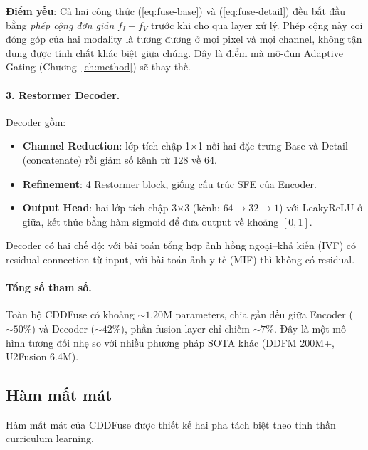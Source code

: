 \textbf{Điểm yếu}: Cả hai công thức (\ref{eq:fuse-base}) và (\ref{eq:fuse-detail}) đều bắt đầu bằng \emph{phép cộng đơn giản} $f_I + f_V$ trước khi cho qua layer xử lý. Phép cộng này coi đóng góp của hai modality là tương đương ở mọi pixel và mọi channel, không tận dụng được tính chất khác biệt giữa chúng. Đây là điểm mà mô-đun Adaptive Gating (Chương~\ref{ch:method}) sẽ thay thế.

\paragraph{3. Restormer Decoder.}
Decoder gồm:
\begin{itemize}\itemsep0pt
    \item \textbf{Channel Reduction}: lớp tích chập 1$\times$1 nối hai đặc trưng Base và Detail (concatenate) rồi giảm số kênh từ 128 về 64.
    \item \textbf{Refinement}: 4 Restormer block, giống cấu trúc SFE của Encoder.
    \item \textbf{Output Head}: hai lớp tích chập 3$\times$3 (kênh: $64 \to 32 \to 1$) với LeakyReLU ở giữa, kết thúc bằng hàm sigmoid để đưa output về khoảng $[0, 1]$.
\end{itemize}
Decoder có hai chế độ: với bài toán tổng hợp ảnh hồng ngoại--khả kiến (IVF) có residual connection từ input, với bài toán ảnh y tế (MIF) thì không có residual.

\paragraph{Tổng số tham số.}
Toàn bộ CDDFuse có khoảng $\sim 1.20$M parameters, chia gần đều giữa Encoder ($\sim 50\%$) và Decoder ($\sim 42\%$), phần fusion layer chỉ chiếm $\sim 7\%$. Đây là một mô hình tương đối nhẹ so với nhiều phương pháp SOTA khác (DDFM 200M+, U2Fusion 6.4M).

\subsection{Hàm mất mát}
\label{ssec:loss}

Hàm mất mát của CDDFuse được thiết kế hai pha tách biệt theo tinh thần curriculum learning.

